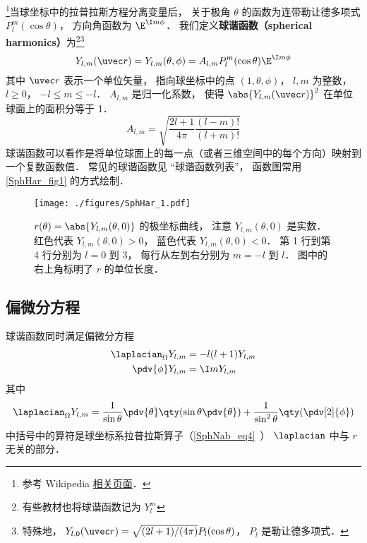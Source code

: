 

\footnote{参考 Wikipedia \href{https://en.wikipedia.org/wiki/Spherical_harmonics}{相关页面}．}当球坐标中的拉普拉斯方程分离变量后， 关于极角 $\theta$ 的函数为连带勒让德多项式 $P_l^m(\cos\theta)$， 方向角函数为 $\E^{\I m\phi}$． 我们定义\textbf{球谐函数（spherical harmonics）}为\footnote{有些教材也将球谐函数记为 $Y_l^m$}\footnote{特殊地， $Y_{l,0}(\uvec r) = \sqrt{(2l + 1)/(4\pi)}P_l(\cos\theta)$， $P_l$ 是勒让德多项式．}
\begin{equation}\label{SphHar_eq1}
Y_{l, m} (\uvec r) = Y_{l, m}(\theta, \phi) = A_{l,m} P_l^m(\cos \theta) \E^{\I m\phi}
\end{equation}
其中 $\uvec r$ 表示一个单位矢量， 指向球坐标中的点 $(1, \theta, \phi)$， $l, m$ 为整数， $l \geqslant 0$， $-l \leqslant m \leqslant -l$． $A_{l,m}$ 是归一化系数， 使得 $\abs{Y_{l, m} (\uvec r)}^2$ 在单位球面上的面积分等于 1．
\begin{equation}\label{SphHar_eq2}
A_{l,m} =  \sqrt{\frac{2l + 1}{4\pi }\frac{(l - m)!}{(l + m)!}}
\end{equation}
球谐函数可以看作是将单位球面上的每一点（或者三维空间中的每个方向）映射到一个复数函数值． 常见的球谐函数见 “球谐函数列表”， 函数图常用\autoref{SphHar_fig1} 的方式绘制．

\begin{figure}[ht]
\centering
\texttt{[image: ./figures/SphHar\_1.pdf]}
\caption{$r(\theta) = \abs{Y_{l,m}(\theta, 0)}$ 的极坐标曲线， 注意 $Y_{l,m}(\theta, 0)$ 是实数． 红色代表 $Y_{l,m}(\theta, 0) > 0$， 蓝色代表 $Y_{l,m}(\theta, 0) < 0$． 第 1 行到第 4 行分别为 $l = 0$ 到 $3$， 每行从左到右分别为 $m = -l$ 到 $l$． 图中的右上角标明了 $r$ 的单位长度．} \label{SphHar_fig1}
\end{figure}

\subsection{偏微分方程}
球谐函数同时满足偏微分方程
\begin{align}
\laplacian_\Omega Y_{l,m} &= -l(l+1)Y_{l,m}\\
\pdv{\phi} Y_{l,m} &= \I m Y_{l,m}
\end{align}
其中
\begin{equation}
\laplacian_\Omega Y_{l,m} = \frac{1}{\sin\theta}\pdv{\theta} \qty(\sin \theta \pdv{\theta}) + \frac{1}{\sin^2 \theta} \qty(\pdv[2]{\phi})
\end{equation}
中括号中的算符是球坐标系拉普拉斯算子（\autoref{SphNab_eq4}~） $\laplacian$ 中与 $r$ 无关的部分．

